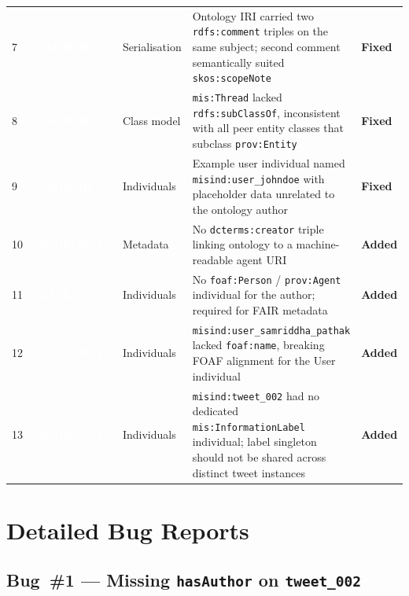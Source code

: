 \documentclass[11pt, a4paper]{article}
\newcommand{\badgeMinor}{\textcolor{white}{\colorbox{severity-minor}{\footnotesize\textbf{\ \ MINOR\ \ }}}}
\newcommand{\badgeEnhancement}{\textcolor{white}{\colorbox{cair-mid}{\footnotesize\textbf{\ ENHANCE\ }}}}
\newcommand{\ind}[1]{\texttt{misind:#1}}
\begin{document}
\begin{table}[H]
\begin{tabularx}{\textwidth}{
  C{0.55cm}
  C{2.0cm}
  C{2.0cm}
  X
  C{1.4cm}
}
7 & \badgeMinor    & Serialisation  & Ontology IRI carried two \texttt{rdfs:comment} triples on the same
                                       subject; second comment semantically suited \texttt{skos:scopeNote} & \textcolor{severity-minor}{\textbf{Fixed}} \\
8 & \badgeMinor    & Class model    & \texttt{mis:Thread} lacked \texttt{rdfs:subClassOf}, inconsistent
                                       with all peer entity classes that subclass \texttt{prov:Entity} & \textcolor{severity-minor}{\textbf{Fixed}} \\
9 & \badgeMinor    & Individuals    & Example user individual named \ind{user\_johndoe} with placeholder
                                       data unrelated to the ontology author & \textcolor{severity-minor}{\textbf{Fixed}} \\
10 & \badgeEnhancement & Metadata   & No \texttt{dcterms:creator} triple linking ontology to a machine-readable
                                        agent URI & \textcolor{severity-minor}{\textbf{Added}} \\
11 & \badgeEnhancement & Individuals & No \texttt{foaf:Person} / \texttt{prov:Agent} individual for the author;
                                        required for FAIR metadata & \textcolor{severity-minor}{\textbf{Added}} \\
12 & \badgeEnhancement & Individuals & \ind{user\_samriddha\_pathak} lacked \texttt{foaf:name}, breaking
                                        FOAF alignment for the User individual & \textcolor{severity-minor}{\textbf{Added}} \\
13 & \badgeEnhancement & Individuals & \ind{tweet\_002} had no dedicated \texttt{mis:InformationLabel}
                                        individual; label singleton should not be shared across distinct tweet instances & \textcolor{severity-minor}{\textbf{Added}} \\
\end{tabularx}
\end{table}
\newpage
\section{Detailed Bug Reports}

\subsection{Bug~\#1 --- Missing \texttt{hasAuthor} on \texttt{tweet\_002}}
\label{bug:1}
\end{document}
